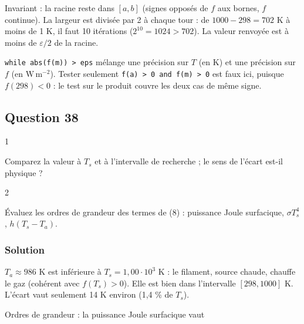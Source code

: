 \documentclass[11pt,a4paper]{article}
\begin{document}
Invariant : la racine reste dans \([a, b]\) (signes opposés de \(f\) aux bornes, \(f\) continue). La largeur est divisée par 2 à chaque tour : de \(1000 - 298 = 702\) K à moins de 1 K, il faut 10 itérations (\(2^{10} = 1024 > 702\)). La valeur renvoyée est à moins de \(\varepsilon/2\) de la racine.

\begin{piege}

\texttt{while\ abs(\allowbreak{}f(\allowbreak{}m)\allowbreak{})\allowbreak{}\ \textgreater{}\ eps} mélange une précision sur \(T\) (en K) et une précision sur \(f\) (en \(\mathrm{W\,m^{-2}}\)). Tester seulement \texttt{f(\allowbreak{}a)\allowbreak{}\ \textgreater{}\ 0\ and\ f(\allowbreak{}m)\allowbreak{}\ \textgreater{}\ 0} est faux ici, puisque \(f(298) < 0\) : le test sur le produit couvre les deux cas de même signe.

\end{piege}

\hypertarget{question-38}{%
\subsection{Question 38}\label{question-38}}

\begin{indication}{1}

Comparez la valeur à \(T_s\) et à l'intervalle de recherche ; le sens de l'écart est-il physique ?

\end{indication}

\begin{indication}{2}

Évaluez les ordres de grandeur des termes de (8) : puissance Joule surfacique, \(\sigma T_s^4\), \(h(T_s - T_a)\).

\end{indication}

\hypertarget{solution-37}{%
\subsubsection{Solution}\label{solution-37}}

\(T_a \approx 986\) K est inférieure à \(T_s = 1{,}00\cdot10^3\) K : le filament, source chaude, chauffe le gaz (cohérent avec \(f(T_s) > 0\)). Elle est bien dans l'intervalle \([298, 1000]\) K. L'écart vaut seulement 14 K environ (1,4 \% de \(T_s\)).

Ordres de grandeur : la puissance Joule surfacique vaut
\end{document}
